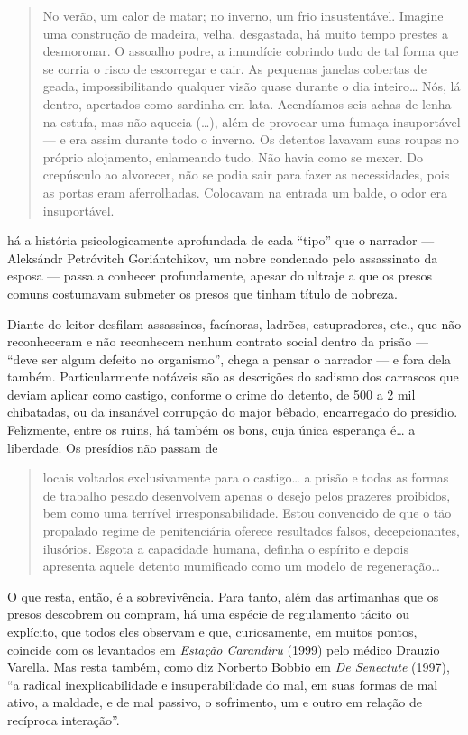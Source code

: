 \begin{quote}
No verão, um calor de matar; no inverno, um frio insustentável.
Imagine uma construção de madeira, velha, desgastada, há muito tempo
prestes a desmoronar. O assoalho podre, a imundície cobrindo tudo de tal
forma que se corria o risco de escorregar e cair. As pequenas janelas
cobertas de geada, impossibilitando qualquer visão quase durante o dia
inteiro\ldots{} Nós, lá dentro, apertados como sardinha em lata. Acendíamos
seis achas de lenha na estufa, mas não aquecia (\ldots{}), além de provocar
uma fumaça insuportável --- e era assim durante todo o inverno. Os
detentos lavavam suas roupas no próprio alojamento, enlameando tudo. Não
havia como se mexer. Do crepúsculo ao alvorecer, não se podia sair para
fazer as necessidades, pois as portas eram aferrolhadas. Colocavam na
entrada um balde, o odor era insuportável.
\end{quote}

há a história psicologicamente aprofundada de cada ``tipo'' que o narrador
--- Aleksándr Petróvitch Goriántchikov, um nobre condenado pelo assassinato
da esposa --- passa a conhecer profundamente, apesar do ultraje a que
os presos comuns costumavam submeter os presos que tinham título de
nobreza.

Diante do leitor desfilam assassinos, facínoras, ladrões, estupradores,
etc., que não reconheceram e não reconhecem nenhum contrato social
dentro da prisão --- ``deve ser algum defeito no organismo'', chega a
pensar o narrador --- e fora dela também. Particularmente notáveis são as
descrições do sadismo dos carrascos que deviam aplicar como
castigo, conforme o crime do detento, de 500 a 2 mil chibatadas, ou da
insanável corrupção do major bêbado, encarregado do presídio. Felizmente,
entre os ruins, há também os bons, cuja única esperança é\ldots{} a liberdade.
Os presídios não passam de

\begin{quote}
locais voltados exclusivamente para o castigo\ldots{} a prisão e todas
as formas de trabalho pesado desenvolvem apenas o desejo pelos prazeres
proibidos, bem como uma terrível irresponsabilidade. Estou convencido de
que o tão propalado regime de penitenciária oferece resultados falsos,
decepcionantes, ilusórios. Esgota a capacidade humana, definha o espírito
e depois apresenta aquele detento mumificado como um modelo de
regeneração\ldots{}
\end{quote}

O que resta, então, é a sobrevivência. Para tanto, além das artimanhas
que os presos descobrem ou compram, há uma espécie de regulamento tácito
ou explícito, que todos eles observam e que, curiosamente, em muitos pontos, coincide com
os levantados em \emph{Estação Carandiru} (1999) pelo médico Drauzio
Varella. Mas resta também, como diz Norberto Bobbio em \emph{De
Senectute} (1997), ``a radical inexplicabilidade e insuperabilidade do
mal, em suas formas de mal ativo, a maldade, e de mal passivo, o
sofrimento, um e outro em relação de recíproca interação''.


